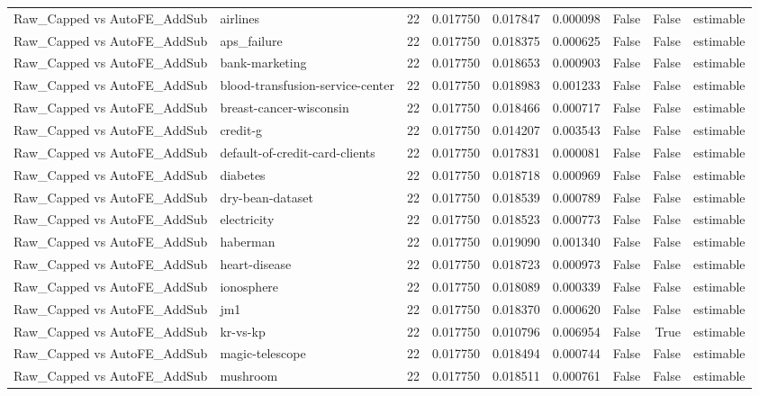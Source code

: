 \begin{table}
\begin{tabular}{llrrrrrrl}
Raw\_Capped vs AutoFE\_AddSub & airlines & 22 & 0.017750 & 0.017847 & 0.000098 & False & False & estimable \\
Raw\_Capped vs AutoFE\_AddSub & aps\_failure & 22 & 0.017750 & 0.018375 & 0.000625 & False & False & estimable \\
Raw\_Capped vs AutoFE\_AddSub & bank-marketing & 22 & 0.017750 & 0.018653 & 0.000903 & False & False & estimable \\
Raw\_Capped vs AutoFE\_AddSub & blood-transfusion-service-center & 22 & 0.017750 & 0.018983 & 0.001233 & False & False & estimable \\
Raw\_Capped vs AutoFE\_AddSub & breast-cancer-wisconsin & 22 & 0.017750 & 0.018466 & 0.000717 & False & False & estimable \\
Raw\_Capped vs AutoFE\_AddSub & credit-g & 22 & 0.017750 & 0.014207 & 0.003543 & False & False & estimable \\
Raw\_Capped vs AutoFE\_AddSub & default-of-credit-card-clients & 22 & 0.017750 & 0.017831 & 0.000081 & False & False & estimable \\
Raw\_Capped vs AutoFE\_AddSub & diabetes & 22 & 0.017750 & 0.018718 & 0.000969 & False & False & estimable \\
Raw\_Capped vs AutoFE\_AddSub & dry-bean-dataset & 22 & 0.017750 & 0.018539 & 0.000789 & False & False & estimable \\
Raw\_Capped vs AutoFE\_AddSub & electricity & 22 & 0.017750 & 0.018523 & 0.000773 & False & False & estimable \\
Raw\_Capped vs AutoFE\_AddSub & haberman & 22 & 0.017750 & 0.019090 & 0.001340 & False & False & estimable \\
Raw\_Capped vs AutoFE\_AddSub & heart-disease & 22 & 0.017750 & 0.018723 & 0.000973 & False & False & estimable \\
Raw\_Capped vs AutoFE\_AddSub & ionosphere & 22 & 0.017750 & 0.018089 & 0.000339 & False & False & estimable \\
Raw\_Capped vs AutoFE\_AddSub & jm1 & 22 & 0.017750 & 0.018370 & 0.000620 & False & False & estimable \\
Raw\_Capped vs AutoFE\_AddSub & kr-vs-kp & 22 & 0.017750 & 0.010796 & 0.006954 & False & True & estimable \\
Raw\_Capped vs AutoFE\_AddSub & magic-telescope & 22 & 0.017750 & 0.018494 & 0.000744 & False & False & estimable \\
Raw\_Capped vs AutoFE\_AddSub & mushroom & 22 & 0.017750 & 0.018511 & 0.000761 & False & False & estimable \\

\end{tabular}
\end{table}
